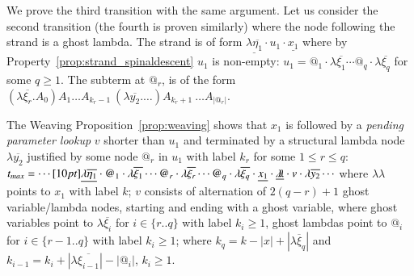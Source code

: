 \documentclass{elsarticle}
\theoremstyle{plain}
\theoremstyle{definition}
\theoremstyle{remark}
\newcommand{\ghostlmd}{{\lambda\!\!\lambda}}
\begin{document}
We prove the third transition with the same argument.
Let us consider the second transition (the fourth is proven similarly) where the node following the strand is a ghost lambda. The strand is of form $\underline{\lambda\overline{\eta_1}} \cdot u_1 \cdot \underline{x_1} $ where by Property~\ref{prop:strand_spinaldescent} $u_1$ is  non-empty: $u_1 =
@_1 \cdot\lambda\overline{\xi_1} \cdots @_q\cdot \lambda\overline{\xi_q}$ for some $q\geq 1$. The subterm at $@_r$, is of the form
$(\lambda\overline{\xi_r}. A_0) A_1 \ldots A_{k_{r}-1}\ (\lambda\overline{y_2}. \ldots)A_{k_{r}+1}\ \ldots A_{|@_r|}$.

The Weaving Proposition~\ref{prop:weaving} shows that $x_1$ is followed by a \emph{pending parameter lookup} $v$ shorter than $u_1$ and terminated by a structural lambda node $\lambda\overline{y_2}$ justified by some node $@_r$ in $u_1$ with label $k_r$ for some $1\leq r \leq q$:
$
   t_{max} = \cdots \Pstr[10pt]{
   {\underline{\lambda\overline{\eta_1}}}
   \cdot {@_1}
   \cdot \lambda\overline{\xi_1}
   \cdots %
        {@_r}
   \cdot \lambda\overline{\xi_r}
   \cdots {@_q}
   \cdot\lambda\overline{\xi_q}
   \cdot %
        {\underline{x_1}}
   \cdot %
        {\underline\ghostlmd}
   \cdot v
   \cdot %
        {\lambda\overline{y_2}}
   \cdots }
   $
where
$\ghostlmd$ points to $x_1$ with label $k$;
$v$ consists of alternation of $2(q-r) +1$ ghost variable/lambda nodes, starting and ending with a ghost variable,
where ghost variables point to $\lambda\overline{\xi_i}$ for
$i \in \{ r..q \}$ with label $k_i\geq1$,
ghost lambdas point to $@_i$ for $i \in \{ r-1..q \}$ with label $k_i\geq1$;
where $k_q = k - |x| + |\lambda\overline{\xi}_q|$ and $ k_{i-1} = k_i + |\lambda\overline{\xi_{i-1}}| - |@_i|$, $k_i\geq1$.
\end{document}
